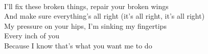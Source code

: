 \\
I'll fix these broken things, repair your broken wings \\
And make sure everything's all right (it's all right, it's all right) \\
My pressure on your hips, I'm sinking my fingertips \\
Every inch of you \\
Because I know that's what you want me to do
